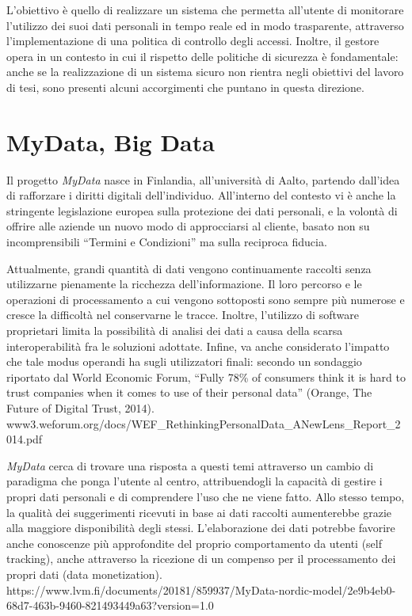L’obiettivo \`e quello di realizzare un sistema che permetta all’utente di monitorare l’utilizzo dei suoi dati personali in tempo reale ed in modo trasparente, attraverso l’implementazione di una politica di controllo degli accessi. Inoltre, il gestore opera in un contesto in cui il rispetto delle politiche di sicurezza \`e fondamentale: anche se la realizzazione di un sistema sicuro non rientra negli obiettivi del lavoro di tesi, sono presenti alcuni accorgimenti che puntano in questa direzione.

\section{MyData, Big Data}
Il progetto \textit{MyData} nasce in Finlandia, all’universit\`a di Aalto, partendo dall’idea di rafforzare i diritti digitali dell’individuo. All’interno del contesto vi \`e anche la stringente legislazione europea sulla protezione dei dati personali, e la volont\`a di offrire alle aziende un nuovo modo di approcciarsi al cliente, basato non su incomprensibili “Termini e Condizioni” ma sulla reciproca fiducia.

Attualmente, grandi quantit\`a di dati vengono continuamente raccolti senza utilizzarne pienamente la ricchezza dell’informazione. Il loro percorso e le operazioni di processamento a cui vengono sottoposti sono sempre pi\`u numerose e cresce la difficolt\`a nel conservarne le tracce. Inoltre, l’utilizzo di software proprietari limita la possibilit\`a di analisi dei dati a causa della scarsa interoperabilit\`a fra le soluzioni adottate. Infine, va anche considerato l’impatto che tale modus operandi ha sugli utilizzatori finali: secondo un sondaggio riportato dal World Economic Forum, “Fully 78\% of consumers think it is hard to trust companies when it comes to use of their personal data” (Orange, The Future of Digital Trust, 2014). www3.weforum.org/docs/WEF\_RethinkingPersonalData\_ANewLens\_Report\_2014.pdf

\textit{MyData} cerca di trovare una risposta a questi temi attraverso un cambio di paradigma che ponga l’utente al centro, attribuendogli la capacit\`a di gestire i propri dati personali e di comprendere l’uso che ne viene fatto. Allo stesso tempo, la qualit\`a dei suggerimenti ricevuti in base ai dati raccolti aumenterebbe grazie alla maggiore disponibilit\`a degli stessi. L’elaborazione dei dati potrebbe favorire anche conoscenze pi\`u approfondite del proprio comportamento da utenti (self tracking), anche attraverso la ricezione di un compenso per il processamento dei propri dati (data monetization). https://www.lvm.fi/documents/20181/859937/MyData-nordic-model/2e9b4eb0-68d7-463b-9460-821493449a63?version=1.0

